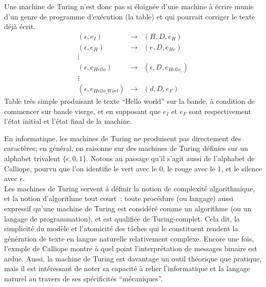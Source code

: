 \documentclass{article}
\begin{document}
				Une machine de Turing n'est donc pas si éloignée d'une machine à écrire munie d'un genre de programme d'exécution (la table) et qui pourrait corriger le texte déjà écrit.  
				\begin{eqnarray*}
				(\epsilon, e_I) &\rightarrow& (H, D, e_H)\\
				(\epsilon, e_H) &\rightarrow& (e, D, e_{He}) \\
				\vdots\\
				(\epsilon, e_{Hello}) &\rightarrow& (\epsilon, D, e_{Hello\_})\\
				\vdots\\
				(\epsilon, e_{Hello\_Worl}) &\rightarrow& (d, D, e_F)
				\end{eqnarray*}
				Table très simple produisant le texte ``Hello world'' sur la bande, à condition de commencer sur bande vierge, et en supposant que $e_I$ et $e_F$ sont respectivement l'état initial et l'état final de la machine.
				
				En informatique, les machines de Turing ne produisent pas directement des caractères; en général, on raisonne sur des machines de Turing définies sur un alphabet trivalent $\lbrace \epsilon, 0, 1 \rbrace$. Notons au passage qu'il s'agit aussi de l'alphabet de Calliope, pourvu que l'on identifie le vert avec le $0$, le rouge avec le $1$, et le silence avec $\epsilon$.\\
				Les machines de Turing servent à définir la notion de complexité algorithmique, et la notion d'algorithme tout court~: toute procédure (ou langage) aussi expressif qu'une machine de Turing est considéré comme un algorithme (ou un langage de programmation), et est qualifiée de Turing-complet. Cela dit, la simplicité du modèle et l'atomicité des tâches qui le constituent rendent la génération de texte en langue naturelle relativement complexe. Encore une fois, l'exmple de Calliope montre à quel point l'interprétation de messages binaire est ardue. Aussi, la machine de Turing est davantage un outil théorique que pratique, mais il est intéressant de noter sa capacité à relier l'informatique et la langage naturel au travers de ses spécificités ``mécaniques''.\\
				
\end{document}

